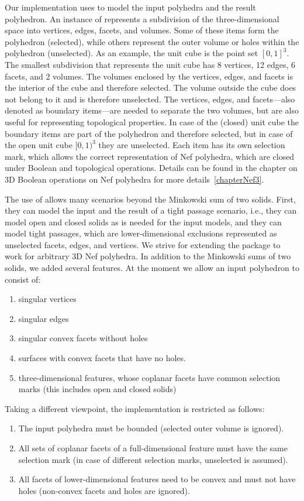 Our implementation uses  to model the input
polyhedra and the result polyhedron. An instance of
 represents a subdivision of the
three-dimensional space into vertices, edges, facets, and
volumes. Some of these items form the polyhedron (selected), while
others represent the outer volume or holes within the polyhedron
(unselected). As an example, the unit cube is the point set
$[0,1]^3$. The smallest subdivision that represents the unit cube has
8 vertices, 12 edges, 6 facets, and 2 volumes. The volumes enclosed by
the vertices, edges, and facets is the interior of the cube and
therefore selected. The volume outside the cube does not belong to it
and is therefore unselected. The vertices, edges, and facets---also
denoted as boundary items---are needed to separate the two volumes,
but are also useful for representing topological properties. In case
of the (closed) unit cube the boundary items are part of the
polyhedron and therefore selected, but in case of the open unit cube
$[0,1)^3$ they are unselected. Each item has its own selection mark,
which allows the correct representation of Nef polyhedra, which are
closed under Boolean and topological operations. Details can be found
in the chapter on 3D Boolean operations on Nef polyhedra for more
details~\ref{chapterNef3}.

The use of  allows many scenarios beyond the
Minkowski sum of two solids. First, they can model the input and the
result of a tight passage scenario, i.e., they can model open and
closed solids as is needed for the input models, and they can model
tight passages, which are lower-dimensional exclusions represented as
unselected facets, edges, and vertices. We strive for extending the
package to work for arbitrary 3D Nef polyhedra. In addition to the
Minkowski sums of two solids, we added several features. At the moment
we allow an input polyhedron to consist of:
\begin{enumerate}
\item singular vertices
\item singular edges
\item singular convex facets without holes
\item surfaces with convex facets that have no holes.
\item three-dimensional features, whose coplanar facets have
common selection marks (this includes open and closed solids)
\end{enumerate}

Taking a different viewpoint, the implementation is restricted as
follows:
\begin{enumerate}
\item The input polyhedra must be bounded (selected outer volume is ignored).
\item All sets of coplanar facets of a full-dimensional
feature must have the same selection mark (in case of different
selection marks, unselected is assumed).
\item All facets of lower-dimensional features need to be convex and 
must not have holes (non-convex facets and holes are ignored).
\end{enumerate}

